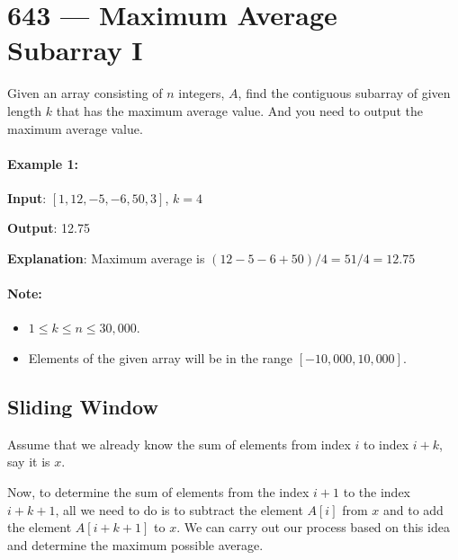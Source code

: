 \section{643 --- Maximum Average Subarray I}
Given an array consisting of $n$ integers, $A$, find the contiguous subarray of given length $k$ that has the maximum average value. And you need to output the maximum average value.

\paragraph{Example 1:}

\begin{flushleft}
\textbf{Input}: $[1,12,-5,-6,50,3]$, $k = 4$

\textbf{Output}: 12.75

\textbf{Explanation}: Maximum average is $(12-5-6+50)/4 = 51/4 = 12.75$

\end{flushleft}
 

\paragraph{Note:}

\begin{itemize}
\item $1 \leq k \leq n \leq 30,000$.
\item Elements of the given array will be in the range $[-10,000, 10,000]$.
\end{itemize}

\subsection{Sliding Window}
Assume that we already know the sum of elements from index $i$ to index $i+k$, say it is $x$.

Now, to determine the sum of elements from the index $i+1$ to the index $i+k+1$, all we need to do is to subtract the element $A[i]$ from $x$ and to add the element $A[i+k+1]$ to $x$. We can carry out our process based on this idea and determine the maximum possible average.
